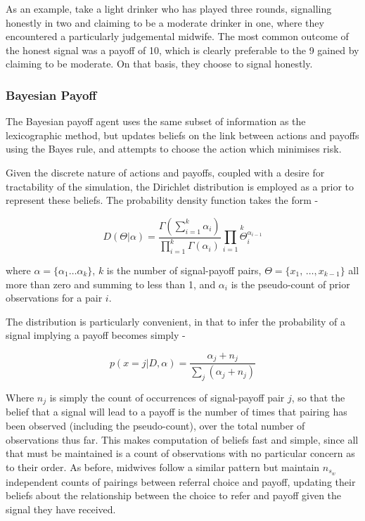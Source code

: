 As an example, take a light drinker who has played three rounds, signalling honestly in two and claiming to be a moderate drinker in one, where they encountered a particularly judgemental midwife. The most common outcome of the honest signal was a payoff of 10, which is clearly preferable to the 9 gained by claiming to be moderate. On that basis, they choose to signal honestly.

\subsubsection{Bayesian Payoff}

The Bayesian payoff agent uses the same subset of information as the lexicographic method, but updates beliefs on the link between actions and payoffs using the Bayes rule, and attempts to choose the action which minimises risk.

Given the discrete nature of actions and payoffs, coupled with a desire for tractability of the
simulation, the Dirichlet distribution is employed as a prior to represent these beliefs. The probability
density function takes the form -

\begin{equation}
D(\Theta|\alpha)=\frac{\Gamma(\sum_{i=1}^{k}\alpha_{i})}{\prod_{i=1}^{k}\Gamma(\alpha_{i})}\overset{k}{\underset{i=1}{\prod}\Theta_{i}^{\alpha_{i-1}}}
\end{equation}


where \(\alpha=\{\alpha_{1}\ldots\alpha_{k}\}\), \(k\) is the number
of signal-payoff pairs, \(\Theta=\{x_{1},\,\ldots,x_{k-\text{1}}\}\) all
more than zero and summing to less than 1, and \(\alpha_{i}\) is the 
pseudo-count of prior observations for a pair \(i\). 

The distribution is particularly convenient, in that to infer the
probability of a signal implying a payoff becomes
simply -

\begin{equation}
p(x=j|D,\alpha)=\frac{\alpha_{j}+n_{j}}{\sum_{j}(\alpha_{j}+n_{j})}\label{eq:posterior}
\end{equation}


Where \(n_{j}\) is simply the count of occurrences of signal-payoff pair \(j\), so
that the belief that a signal will lead to a payoff is the number
of times that pairing has been observed (including the pseudo-count),
over the total number of observations thus far. This makes computation
of beliefs fast and simple, since all that must be maintained is
a count of observations with no particular concern as to their order.
As before, midwives follow a similar pattern but maintain \(n_{s_{w}}\) independent counts of pairings between referral choice and payoff, updating their beliefs about the relationship between the choice to refer and payoff given the signal they have received.

